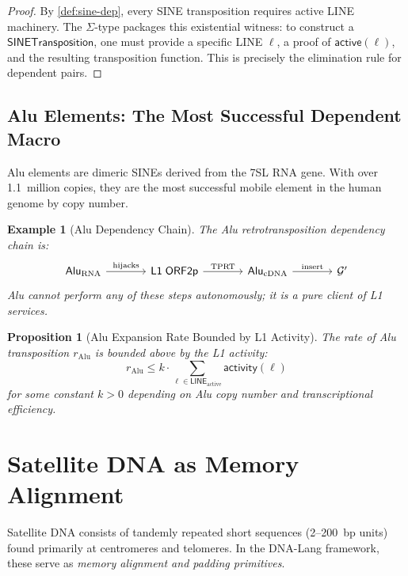 \documentclass[12pt,a4paper]{article}
\newtheorem{proposition}[theorem]{Proposition}
\newtheorem{example}[theorem]{Example}
\newcommand{\Genome}{\mathcal{G}}
\newcommand{\LINE}{\mathsf{LINE}}
\begin{document}
\begin{proof}
By \cref{def:sine-dep}, every SINE transposition requires active LINE machinery.
The $\Sigma$-type packages this existential witness: to construct a
$\mathsf{SINETransposition}$, one must provide a specific LINE $\ell$, a proof of
$\mathsf{active}(\ell)$, and the resulting transposition function. This is precisely
the elimination rule for dependent pairs.
\end{proof}

\subsection{Alu Elements: The Most Successful Dependent Macro}

Alu elements are dimeric SINEs derived from the 7SL RNA gene. With over 1.1~million
copies, they are the most successful mobile element in the human genome by copy number.

\begin{example}[Alu Dependency Chain]\label{ex:alu}
The Alu retrotransposition dependency chain is:
\[
\begin{tikzcd}[column sep=large]
  \mathsf{Alu}_{\mathrm{RNA}} \arrow[r, "\text{hijacks}"] &
  \mathsf{L1\;ORF2p} \arrow[r, "\text{TPRT}"] &
  \mathsf{Alu}_{\mathrm{cDNA}} \arrow[r, "\text{insert}"] &
  \Genome'
\end{tikzcd}
\]
Alu cannot perform any of these steps autonomously; it is a pure \emph{client} of
L1 services.
\end{example}

\begin{proposition}[Alu Expansion Rate Bounded by L1 Activity]\label{prop:alu-bound}
The rate of Alu transposition $r_{\mathrm{Alu}}$ is bounded above by the L1 activity:
\[
  r_{\mathrm{Alu}} \leq k \cdot \sum_{\ell \in \LINE_{\mathrm{active}}} \mathsf{activity}(\ell)
\]
for some constant $k > 0$ depending on Alu copy number and transcriptional efficiency.
\end{proposition}


\section{Satellite DNA as Memory Alignment}\label{sec:satellite}

Satellite DNA consists of tandemly repeated short sequences (2--200~bp units) found
primarily at centromeres and telomeres. In the DNA-Lang framework, these serve as
\emph{memory alignment and padding primitives}.
\end{document}
